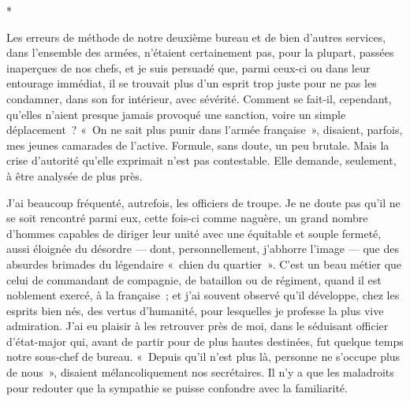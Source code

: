 \documentclass[french,twoside]{book} %
\begin{document}
\begin{center}
\noindent \centerline{*}\par
\end{center}

\noindent Les erreurs de méthode de notre deuxième bureau et de bien d’autres services, dans l’ensemble des armées, n’étaient certainement pas, pour la plupart, passées inaperçues de nos chefs, et je suis persuadé que, parmi ceux-ci ou dans leur entourage immédiat, il se trouvait plus d’un esprit trop juste pour ne pas les condamner, dans son for intérieur, avec sévérité. Comment se fait-il, cependant, qu’elles n’aient presque jamais provoqué une sanction, voire un simple déplacement ? « On ne sait plus punir dans l’armée française », disaient, parfois, mes jeunes camarades de l’active. Formule, sans doute, un peu brutale. Mais la crise d’autorité qu’elle exprimait n’est pas contestable. Elle demande, seulement, à être analysée de plus près.\par
J’ai beaucoup fréquenté, autrefois, les officiers de troupe. Je ne doute pas qu’il ne se soit rencontré parmi eux, cette fois-ci comme naguère, un grand nombre d’hommes capables de diriger leur unité avec une équitable et souple fermeté, aussi éloignée du désordre — dont, personnellement, j’abhorre l’image — que des absurdes brimades du légendaire « chien du quartier ». C’est un beau métier que celui de   commandant de compagnie, de bataillon ou de régiment, quand il est noblement exercé, à la française ; et j’ai souvent observé qu’il développe, chez les esprits bien nés, des vertus d’humanité, pour lesquelles je professe la plus vive admiration. J’ai eu plaisir à les retrouver près de moi, dans le séduisant officier d’état-major qui, avant de partir pour de plus hautes destinées, fut quelque temps notre sous-chef de bureau. « Depuis qu’il n’est plus là, personne ne s’occupe plus de nous », disaient mélancoliquement nos secrétaires. Il n’y a que les maladroits pour redouter que la sympathie se puisse confondre avec la familiarité.\par
\end{document}
